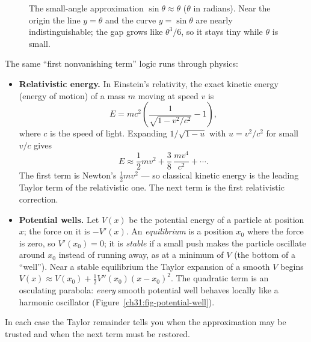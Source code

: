 \begin{figure}[H]
\centering
{}
\caption{The small-angle approximation $\sin\theta \approx \theta$ ($\theta$ in radians). Near the origin
the line $y=\theta$ and the curve $y=\sin\theta$ are nearly indistinguishable; the gap
grows like $\theta^3/6$, so it stays tiny while $\theta$ is small.}
\label{ch31:fig-small-angle}
\end{figure}

\begin{applicationbox}
The same ``first nonvanishing term'' logic runs through physics:
\begin{itemize}
\item \textbf{Relativistic energy.} In Einstein's relativity, the exact kinetic energy
(energy of motion) of a mass $m$ moving at speed $v$ is
\[
  E = mc^2\left(\frac{1}{\sqrt{1-v^2/c^2}} - 1\right),
\]
where $c$ is the speed of light. Expanding $1/\sqrt{1-u}$ with $u = v^2/c^2$ for small
$v/c$ gives
\[
  E \approx \frac12 mv^2 + \frac{3}{8}\,\frac{mv^4}{c^2} + \cdots.
\]
The first term is Newton's $\tfrac12 mv^2$ --- so classical kinetic energy is the
leading Taylor term of the relativistic one. The next term is the first relativistic
correction.
\item \textbf{Potential wells.} Let $V(x)$ be the potential energy of a particle at
position $x$; the force on it is $-V'(x)$. An \emph{equilibrium} is a position $x_0$ where
the force is zero, so $V'(x_0)=0$; it is \emph{stable} if a small push makes the particle
oscillate around $x_0$ instead of running away, as at a minimum of $V$ (the bottom of a
``well''). Near a stable equilibrium the Taylor expansion of a smooth $V$ begins
$V(x) \approx V(x_0) + \tfrac12 V''(x_0)(x-x_0)^2$. The quadratic term is an osculating parabola:
\emph{every} smooth potential well behaves locally like a harmonic oscillator
(Figure~\ref{ch31:fig-potential-well}).
\end{itemize}
In each case the Taylor remainder tells you when the approximation may be trusted
and when the next term must be restored.
\end{applicationbox}

